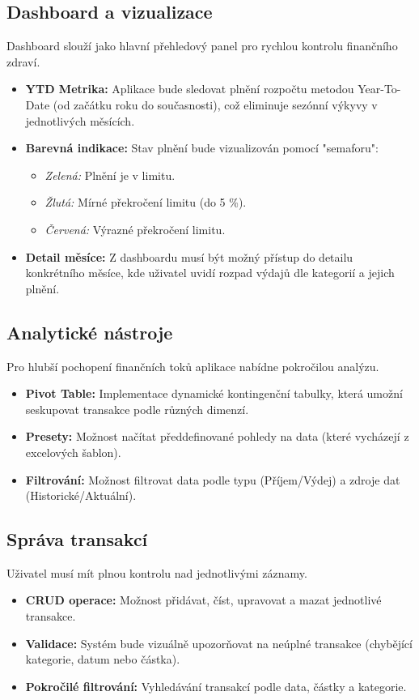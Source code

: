 \documentclass[
program=itk,
biblatex,
language=czech,
font=sans,
figures=true,
tables=false,
sourcecodes=false,
glossaries,
index
]{kidiplom}
\begin{document}
\subsection{Dashboard a vizualizace}
Dashboard slouží jako hlavní přehledový panel pro rychlou kontrolu finančního zdraví.
\begin{itemize}
    \item \textbf{YTD Metrika:} Aplikace bude sledovat plnění rozpočtu metodou Year-To-Date (od začátku roku do současnosti), což eliminuje sezónní výkyvy v jednotlivých měsících.
    \item \textbf{Barevná indikace:} Stav plnění bude vizualizován pomocí "semaforu":
    \begin{itemize}
        \item \textit{Zelená:} Plnění je v limitu.
        \item \textit{Žlutá:} Mírné překročení limitu (do 5 \%).
        \item \textit{Červená:} Výrazné překročení limitu.
    \end{itemize}
    \item \textbf{Detail měsíce:} Z dashboardu musí být možný přístup do detailu konkrétního měsíce, kde uživatel uvidí rozpad výdajů dle kategorií a jejich plnění.
\end{itemize}

\subsection{Analytické nástroje}
Pro hlubší pochopení finančních toků aplikace nabídne pokročilou analýzu.
\begin{itemize}
    \item \textbf{Pivot Table:} Implementace dynamické kontingenční tabulky, která umožní seskupovat transakce podle různých dimenzí.
    \item \textbf{Presety:} Možnost načítat předdefinované pohledy na data (které vycházejí z excelových šablon).
    \item \textbf{Filtrování:} Možnost filtrovat data podle typu (Příjem/Výdej) a zdroje dat (Historické/Aktuální).
\end{itemize}

\subsection{Správa transakcí}
Uživatel musí mít plnou kontrolu nad jednotlivými záznamy.
\begin{itemize}
    \item \textbf{CRUD operace:} Možnost přidávat, číst, upravovat a mazat jednotlivé transakce.
    \item \textbf{Validace:} Systém bude vizuálně upozorňovat na neúplné transakce (chybějící kategorie, datum nebo částka).
    \item \textbf{Pokročilé filtrování:} Vyhledávání transakcí podle data, částky a kategorie.
\end{itemize}
\end{document}
